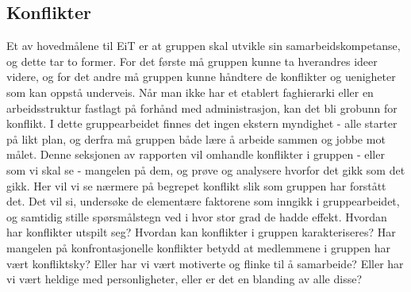\subsection{Konflikter}

Et av hovedmålene til EiT er at gruppen skal utvikle sin samarbeidskompetanse\cite{eitlaeringsmaal}, og dette tar to former.
For det første må gruppen kunne ta hverandres ideer videre, og for det andre må gruppen kunne håndtere de konflikter og uenigheter som kan oppstå underveis.
Når man ikke har et etablert faghierarki eller en arbeidsstruktur fastlagt på forhånd med administrasjon, kan det bli grobunn for konflikt. 
I dette gruppearbeidet finnes det ingen ekstern myndighet - alle starter på likt plan, og derfra må gruppen både lære å arbeide sammen og jobbe mot målet. 
Denne seksjonen av rapporten vil omhandle konflikter i gruppen - eller som vi skal se - mangelen på dem, og prøve og analysere hvorfor det gikk som det gikk.
Her vil vi se nærmere på begrepet konflikt slik som gruppen har forstått det.
Det vil si, undersøke de elementære faktorene som inngikk i gruppearbeidet, og samtidig stille spørsmålstegn ved i hvor stor grad de hadde effekt.
Hvordan har konflikter utspilt seg?
Hvordan kan konflikter i gruppen karakteriseres? 
Har mangelen på konfrontasjonelle konflikter betydd at medlemmene i gruppen har vært konfliktsky? Eller har vi vært motiverte og flinke til å samarbeide? Eller har vi vært heldige med personligheter, eller er det en blanding av alle disse?
